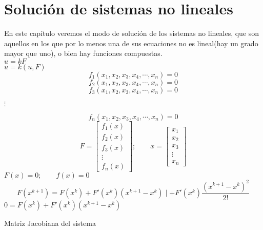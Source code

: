 \chapter{Soluci\'on de sistemas no lineales}

En este cap\'itulo veremos el modo de soluci\'on de los sistemas no lineales, que son aquellos en los que por lo menos una de sus ecuaciones no es lineal(hay un grado mayor que uno), o bien hay funciones compuestas.\\
$u=kF$\\
$u=k(u,F)$\\
\begin{displaymath}
f_1(x_1,x_2,x_3,x_4,\cdots, x_n)=0
\end{displaymath}
\begin{displaymath}
f_2(x_1,x_2,x_3,x_4,\cdots, x_n)=0
\end{displaymath}
\begin{displaymath}
f_3(x_1,x_2,x_3,x_4,\cdots, x_n)=0
\end{displaymath}
\begin{center}
$\vdots$
\end{center}
\begin{displaymath}
f_n(x_1,x_2,x_3,x_4,\cdots, x_n)=0
\end{displaymath}
\begin{displaymath}
F=\begin{bmatrix}
f_1(x)\\
f_2(x)\\
f_3(x)\\
\vdots \\
f_n(x)
\end{bmatrix}; \qquad x=\begin{bmatrix}
x_1\\
x_2\\
x_3\\
\vdots \\
x_n
\end{bmatrix}
\end{displaymath}
$F(x)=0; \qquad f(x)=0$\\
\begin{displaymath}
F(x^{k+1})=F(x^k)+F'(x^k)(x^{k+1}-x^k)\mid +F'(x^k)\frac{(x^{k+1}-x^k)^2}{2!}
\end{displaymath}
$0=F(x^k)+F'(x^k)(x^{k+1}-x^k)$\\
\begin{center}
Matriz Jacobiana del sistema
\end{center}
